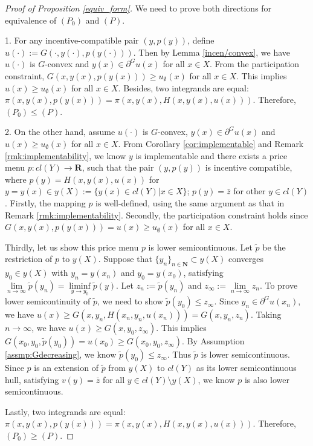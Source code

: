\documentclass[a4paper, 11pt]{amsart}
\numberwithin{equation}{section}
\theoremstyle{plain}
\theoremstyle{definition}
\theoremstyle{remark}
\newcommand{\R}{\mathbf{R}}
\newcommand{\N}{\mathbf{N}}
\begin{document}
\begin{proof} [Proof of Proposition \ref{equiv_form}] We need to prove both directions for equivalence of $(P_0)$ and $(P)$.\medskip
	
	1. For any incentive-compatible pair $(y, p(y))$, define $u(\cdot) := G(\cdot,y(\cdot), p(y(\cdot)))$. Then by Lemma \ref{incen/convex}, we have $u(\cdot)$ is $G$-convex and $y(x) \in \partial^G u(x)$ for all $x \in X$. From the participation constraint, $G(x, y(x), p(y(x))) \ge u_{\emptyset}(x)$ for all $x\in X$. This implies $u(x)\ge u_{\emptyset}(x)$ for all $x\in X$. Besides, two integrands are equal: $\pi(x, y(x), p(y(x))) = \pi(x,y(x), H(x,y(x), u(x)))$. Therefore, $(P_0) \le (P)$.\medskip
	
	2. On the other hand, assume $u(\cdot)$ is $G$-convex, $y(x)\in \partial^G u(x)$ and $u(x) \ge u_{\emptyset}(x)$ for all $x \in X$. From Corollary \ref{cor:implementable} and Remark \ref{rmk:implementability}, we know $y$ is implementable and there exists a price menu $p: cl(Y) \longrightarrow \R$, such that the pair $(y, p(y))$ is incentive compatible, where $p(y) = H(x,y(x), u(x))$ for $y = y(x) \in y(X) :=\{ y(x) \in cl(Y) | x \in X \}$; $p(y) = \bar{z}$ for other $y\in cl(Y)$. Firstly, the mapping $p$ is well-defined, using the same argument as that in Remark \ref{rmk:implementability}. %
	Secondly, the participation constraint holds since $G(x,y(x), p(y(x))) = u(x) \ge u_{\emptyset}(x)$ for all $x\in X$. \medskip
	
	Thirdly, let us show this price menu $p$ is lower semicontinuous. Let $\tilde{p}$ be the restriction of $p$ to $y(X)$. Suppose that $\{y_n\}_{n\in \N} \subset y(X)$ converges $y_0 \in y(X)$ with $y_n = y(x_n)$ and $y_0 = y(x_0)$, satisfying $\lim\limits_{n \rightarrow \infty} \tilde{p}(y_n) = \liminf\limits_{y \rightarrow y_{0}} \tilde{p}(y)$.  Let $z_n:= \tilde{p}(y_n)$ and $z_{\infty}:=\lim\limits_{n \rightarrow \infty} z_n$. To prove lower semicontinuity of $\tilde{p}$, we need to show $\tilde{p}(y_0)\le z_{\infty}$.  Since $y_n \in \partial^G u(x_n)$, we have $u(x) \ge G(x,y_n, H(x_n, y_n, u(x_n))) = G(x, y_n, z_n)$. Taking $n\longrightarrow \infty$, we have $u(x)\ge G(x, y_0, z_{\infty})$. This implies $G(x_0, y_0, \tilde{p}(y_0)) = u(x_0) \ge G(x_0, y_0, z_{\infty})$. By Assumption \ref{assmp:Gdecreasing}, we know $\tilde{p}(y_0) \le z_{\infty}$. Thus $\tilde{p}$ is lower semicontinuous. Since $p$ is an extension of $\tilde{p}$ from $y(X)$ to $cl(Y)$ as its lower semicontinuous hull, satisfying $v(y)= \bar{z}$ for all $y\in cl(Y)\setminus y(X)$, we know $p$ is also lower semicontinuous.
	\medskip
	
	Lastly, two integrands are equal: $\pi(x, y(x), p(y(x))) = \pi(x,y(x), H(x,y(x), u(x)))$. Therefore, $(P_0) \ge (P)$.
\end{proof}
\end{document}
